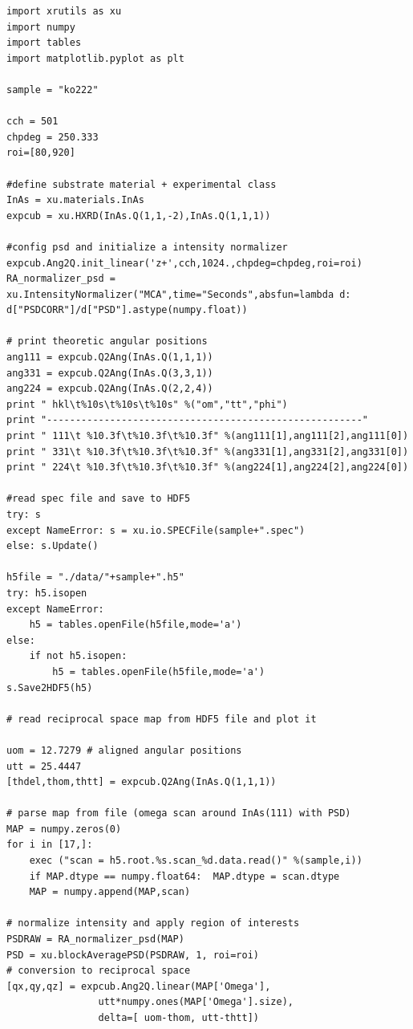 \begin{lstlisting}[caption={reading a spec-file, saving it to HDF5, reading a particular scan, convert it to reciprocal space, plot it using matplotlib}]
import xrutils as xu
import numpy
import tables
import matplotlib.pyplot as plt

sample = "ko222"

cch = 501
chpdeg = 250.333
roi=[80,920]

#define substrate material + experimental class
InAs = xu.materials.InAs
expcub = xu.HXRD(InAs.Q(1,1,-2),InAs.Q(1,1,1))

#config psd and initialize a intensity normalizer
expcub.Ang2Q.init_linear('z+',cch,1024.,chpdeg=chpdeg,roi=roi)
RA_normalizer_psd = xu.IntensityNormalizer("MCA",time="Seconds",absfun=lambda d: d["PSDCORR"]/d["PSD"].astype(numpy.float))

# print theoretic angular positions
ang111 = expcub.Q2Ang(InAs.Q(1,1,1))
ang331 = expcub.Q2Ang(InAs.Q(3,3,1))
ang224 = expcub.Q2Ang(InAs.Q(2,2,4))
print " hkl\t%10s\t%10s\t%10s" %("om","tt","phi")
print "-------------------------------------------------------"
print " 111\t %10.3f\t%10.3f\t%10.3f" %(ang111[1],ang111[2],ang111[0])
print " 331\t %10.3f\t%10.3f\t%10.3f" %(ang331[1],ang331[2],ang331[0])
print " 224\t %10.3f\t%10.3f\t%10.3f" %(ang224[1],ang224[2],ang224[0])

#read spec file and save to HDF5
try: s
except NameError: s = xu.io.SPECFile(sample+".spec")
else: s.Update()

h5file = "./data/"+sample+".h5"
try: h5.isopen
except NameError:
    h5 = tables.openFile(h5file,mode='a')
else:
    if not h5.isopen:
        h5 = tables.openFile(h5file,mode='a')
s.Save2HDF5(h5)

# read reciprocal space map from HDF5 file and plot it

uom = 12.7279 # aligned angular positions
utt = 25.4447
[thdel,thom,thtt] = expcub.Q2Ang(InAs.Q(1,1,1))

# parse map from file (omega scan around InAs(111) with PSD)
MAP = numpy.zeros(0)
for i in [17,]:
    exec ("scan = h5.root.%s.scan_%d.data.read()" %(sample,i))
    if MAP.dtype == numpy.float64:  MAP.dtype = scan.dtype
    MAP = numpy.append(MAP,scan)

# normalize intensity and apply region of interests
PSDRAW = RA_normalizer_psd(MAP)
PSD = xu.blockAveragePSD(PSDRAW, 1, roi=roi)
# conversion to reciprocal space
[qx,qy,qz] = expcub.Ang2Q.linear(MAP['Omega'],
                utt*numpy.ones(MAP['Omega'].size),
                delta=[ uom-thom, utt-thtt])


\end{lstlisting}

